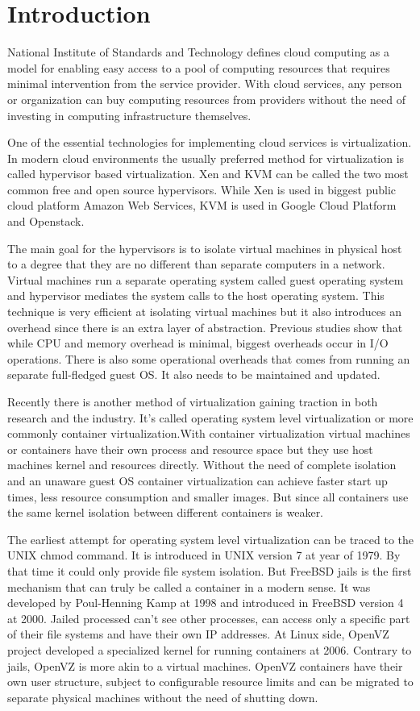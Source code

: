 \documentclass[12pt,oneandhalf,chaparabic,ceng,ms,eng,oneside,pntc]{gsufbe}
\begin{document}
\section{Introduction}
National Institute of Standards and Technology defines cloud computing as a model for enabling
easy access to a pool of computing resources that requires minimal intervention from the service
provider. With cloud services, any person or organization can buy computing resources from providers
without the need of investing in computing infrastructure themselves. 

One of the essential technologies for implementing cloud services is virtualization. In modern cloud
environments the usually preferred method for virtualization is called hypervisor based virtualization.
Xen and KVM can be called the two most common free and open source hypervisors. While Xen is used in
biggest public cloud platform Amazon Web Services, KVM is used in Google Cloud Platform and Openstack.

The main goal for the hypervisors is to isolate virtual machines in physical host to a degree that they
are no different than separate computers in a network. Virtual machines run a separate operating system
called guest operating system and hypervisor mediates the system calls to the host operating system.
This technique is very efficient at isolating virtual machines but it also introduces an overhead
since there is an extra layer of abstraction. Previous studies show that while CPU and memory overhead
is minimal, biggest overheads occur in I/O operations. There is also some operational overheads that
comes from running an separate full-fledged guest OS. It also needs to be maintained and updated.

Recently there is another method of virtualization gaining traction in both research and the industry.
It's called operating system level virtualization or more commonly container virtualization.With
container virtualization virtual machines or containers have their own process and resource space but
they use host machines kernel and resources directly. Without the need of complete isolation and an
unaware guest OS container virtualization can achieve faster start up times, less resource consumption
and smaller images. But since all containers use the same kernel isolation between different containers
is weaker.

The earliest attempt for operating system level virtualization can be traced to the UNIX chmod command.
It is introduced in UNIX version 7 at year of 1979. By that time it could only provide file system
isolation. But FreeBSD jails is the first mechanism that can truly be called a container in a modern
sense. It was developed by Poul-Henning Kamp at 1998 and introduced in FreeBSD version 4 at 2000.
Jailed processed can't see other processes, can access only a specific part of their file systems and
have their own IP addresses. At Linux side, OpenVZ project developed a specialized kernel for running
containers at 2006. Contrary to jails, OpenVZ is more akin to a virtual machines. OpenVZ containers
have their own user structure, subject to configurable resource limits and can be migrated to separate
physical machines without the need of shutting down.
\end{document}

